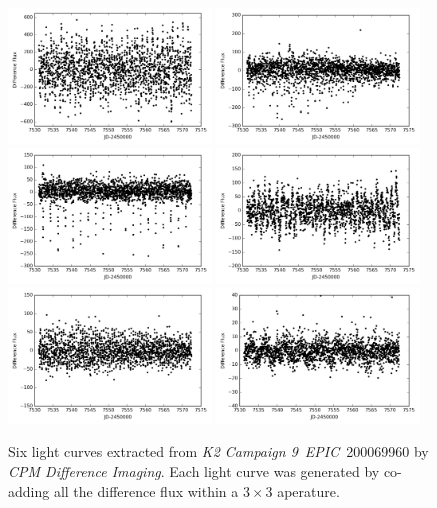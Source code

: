 \documentclass[12pt, preprint]{aastex}
\newcommand{\project}[1]{\textsl{#1}}
\newcommand{\cpmdiff}{\project{CPM Difference Imaging}}
\newcommand{\KTCN}{\project{K2 Campaign 9}}
\newcommand{\epic}{\project{EPIC}}
\begin{document}
\begin{figure}[p]
\begin{center}
\includegraphics[width=0.48\textwidth]{f6a}
\includegraphics[width=0.48\textwidth]{f6b}
\includegraphics[width=0.48\textwidth]{f6c}
\includegraphics[width=0.48\textwidth]{f6d}
\includegraphics[width=0.48\textwidth]{f6e}
\includegraphics[width=0.48\textwidth]{f6f}
\end{center}
\caption{
  \label{lightcurve}
  Six light curves extracted from \KTCN\ \epic\ 200069960 by \cpmdiff. 
  Each light curve was generated by co-adding all the difference flux within a $3\times 3$ aperature.
}
\end{figure}
\end{document}

